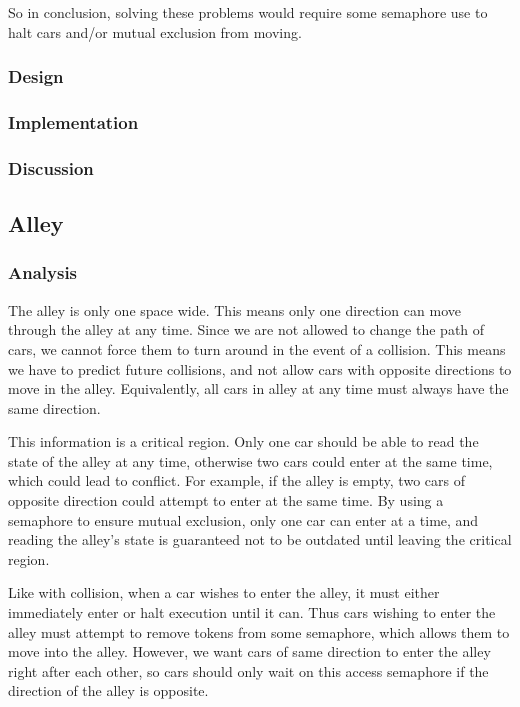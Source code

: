 So in conclusion, solving these problems would require some semaphore use to halt cars and/or mutual exclusion from moving.

\subsubsection*{Design}

\subsubsection*{Implementation}

\subsubsection*{Discussion}


\subsection*{Alley}

\subsubsection*{Analysis}
The alley is only one space wide. This means only one direction can move through the alley at any time. Since we are not allowed to change the path of cars, we cannot force them to turn around in the event of a collision. This means we have to predict future collisions, and not allow cars with opposite directions to move in the alley. Equivalently, all cars in alley at any time must always have the same direction.

This information is a critical region. Only one car should be able to read the state of the alley at any time, otherwise two cars could enter at the same time, which could lead to conflict. For example, if the alley is empty, two cars of opposite direction could attempt to enter at the same time. By using a semaphore to ensure mutual exclusion, only one car can enter at a time, and reading the alley's state is guaranteed not to be outdated until leaving the critical region.

Like with collision, when a car wishes to enter the alley, it must either immediately enter or halt execution until it can. Thus cars wishing to enter the alley must attempt to remove tokens from some semaphore, which allows them to move into the alley. However, we want cars of same direction to enter the alley right after each other, so cars should only wait on this access semaphore if the direction of the alley is opposite.

